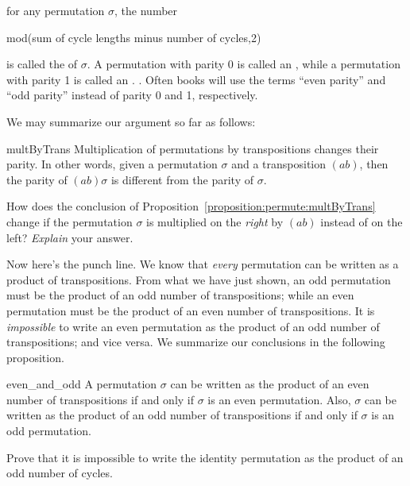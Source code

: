 \begin{defn} for any permutation $\sigma$, the number 

\begin{center}
mod(sum of cycle lengths minus number of cycles,2)
\end{center}

\noindent
is called the  of $\sigma$. A permutation with parity 0 is called an , while a  permutation with parity 1 is called an . .  Often books will use the terms ``even parity'' and ``odd parity''  instead of parity 0 and 1, respectively.
\end{defn}

We may  summarize our argument so far as follows:

\begin{prop}{multByTrans}
Multiplication of permutations by transpositions changes their parity. In other words, given a permutation $\sigma$ and a transposition $(ab)$, then the parity of $(ab)\sigma$ is different from the parity of $\sigma$.
\end{prop}

\begin{exercise}
How does the conclusion of Proposition~\ref{proposition:permute:multByTrans} change if the permutation $\sigma$ is multiplied on the \emph{right} by $(ab)$ instead of on the left?  \emph{Explain} your answer.
\end{exercise}

Now here's the punch line. We know that \emph{every} permutation can be written as a product of transpositions. 
From what we have just shown, an odd permutation must be the product of an odd number of transpositions; while an even permutation must be the product of an even number of transpositions. It is \emph{impossible} to write an even permutation as the product of an odd number of transpositions; and vice versa. 
We summarize our conclusions in the following proposition.

\begin{prop}{even_and_odd}
A permutation $\sigma$ can be written as the product of an even number of transpositions if and only if $\sigma$ is an even permutation. 
Also, $\sigma$ can be written as the product of an odd number of transpositions if and only if $\sigma$ is an odd permutation. 
\end{prop}


\begin{exercise}{}
Prove that it is impossible to write the identity permutation as the product of an odd number of cycles.
\end{exercise}



